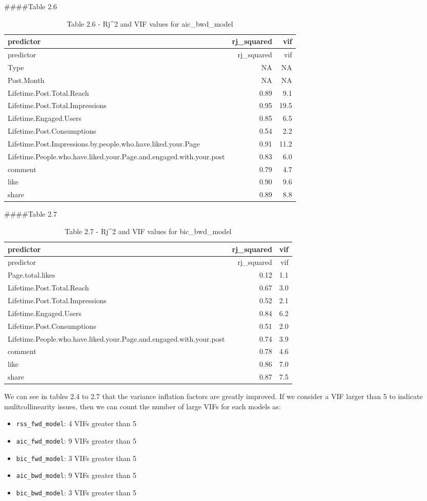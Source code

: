 \documentclass[
]{article}
\providecommand{\tightlist}{%
  \setlength{\itemsep}{0pt}\setlength{\parskip}{0pt}}
\begin{document}
\#\#\#\#Table 2.6

\begin{longtable}[]{@{}lrr@{}}
\caption{Table 2.6 - Rj\^{}2 and VIF values for
aic\_bwd\_model}\tabularnewline
\toprule
predictor & rj\_squared & vif\tabularnewline
\midrule
\endfirsthead
\toprule
predictor & rj\_squared & vif\tabularnewline
\midrule
\endhead
Type & NA & NA\tabularnewline
Post.Month & NA & NA\tabularnewline
Lifetime.Post.Total.Reach & 0.89 & 9.1\tabularnewline
Lifetime.Post.Total.Impressions & 0.95 & 19.5\tabularnewline
Lifetime.Engaged.Users & 0.85 & 6.5\tabularnewline
Lifetime.Post.Consumptions & 0.54 & 2.2\tabularnewline
Lifetime.Post.Impressions.by.people.who.have.liked.your.Page & 0.91 &
11.2\tabularnewline
Lifetime.People.who.have.liked.your.Page.and.engaged.with.your.post &
0.83 & 6.0\tabularnewline
comment & 0.79 & 4.7\tabularnewline
like & 0.90 & 9.6\tabularnewline
share & 0.89 & 8.8\tabularnewline
\bottomrule
\end{longtable}

\#\#\#\#Table 2.7

\begin{longtable}[]{@{}lrr@{}}
\caption{Table 2.7 - Rj\^{}2 and VIF values for
bic\_bwd\_model}\tabularnewline
\toprule
predictor & rj\_squared & vif\tabularnewline
\midrule
\endfirsthead
\toprule
predictor & rj\_squared & vif\tabularnewline
\midrule
\endhead
Page.total.likes & 0.12 & 1.1\tabularnewline
Lifetime.Post.Total.Reach & 0.67 & 3.0\tabularnewline
Lifetime.Post.Total.Impressions & 0.52 & 2.1\tabularnewline
Lifetime.Engaged.Users & 0.84 & 6.2\tabularnewline
Lifetime.Post.Consumptions & 0.51 & 2.0\tabularnewline
Lifetime.People.who.have.liked.your.Page.and.engaged.with.your.post &
0.74 & 3.9\tabularnewline
comment & 0.78 & 4.6\tabularnewline
like & 0.86 & 7.0\tabularnewline
share & 0.87 & 7.5\tabularnewline
\bottomrule
\end{longtable}

We can see in tables 2.4 to 2.7 that the variance inflation factors are
greatly improved. If we consider a VIF larger than 5 to indicate
mulitcollinearity issues, then we can count the number of large VIFs for
each models as:

\begin{itemize}
\tightlist
\item
  \texttt{rss\_fwd\_model}: 4 VIFs greater than 5
\item
  \texttt{aic\_fwd\_model}: 9 VIFs greater than 5
\item
  \texttt{bic\_fwd\_model}: 3 VIFs greater than 5
\item
  \texttt{aic\_bwd\_model}: 9 VIFs greater than 5
\item
  \texttt{bic\_bwd\_model}: 3 VIFs greater than 5
\end{itemize}
\end{document}
